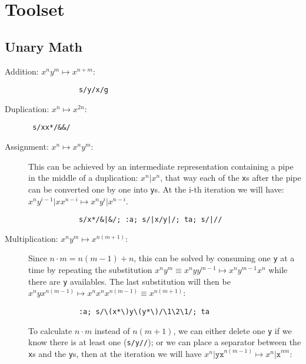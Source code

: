 \section{Toolset}

\subsection{Unary Math}

\begin{description}
	\item[Addition: $x^ny^m\mapsto x^{n+m}$:]
		\begin{verbatim}
			s/y/x/g
		\end{verbatim}

	\item[Duplication: $x^n\mapsto x^{2n}$:]
		\begin{verbatim} s/xx*/&&/ \end{verbatim}

	\item[Assignment: $x^n\mapsto x^ny^m$:]

		This can be achieved by an intermediate representation containing a pipe in
		the middle of a duplication: $x^n\texttt{|}x^n$, that way each of the
		{\tt x}s after the pipe can be converted one by one into {\tt y}s.  At the
		i-th iteration we will have:
		$x^ny^{i-1}\texttt{|}xx^{n-i} \mapsto x^ny^i\texttt{|}x^{n-i}$.

		\begin{Verbatim}
			s/x*/&|&/; :a; s/|x/y|/; ta; s/|//
		\end{Verbatim}

	\item[Multiplication: $x^ny^m\mapsto x^{n(m+1)}$:]

		Since $n\cdot m=n(m-1)+n$, this can be solved by consuming one {\tt y}
		at a time by repeating the substitution $x^ny^m \equiv x^nyy^{m-1}
		\mapsto	x^ny^{m-1}x^n$ while there are {\tt y} availables.  The last
		substitution will then be $x^nyx^{n(m-1)} \mapsto x^nx^nx^{n(m-1)}
		\equiv x^{n(m+1)}$:

		\begin{Verbatim}
			:a; s/\(x*\)y\(y*\)/\1\2\1/; ta
		\end{Verbatim}

		To calculate $n\cdot m$ instead of $n(m+1)$, we can either delete one
		{\tt y} if we know there is at least one (\verb|s/y//|); or we can place
		a separator between the {\tt x}s and the {\tt y}s, then at the iteration
		we will have $x^n\texttt{|yx}^{n(m-1)} \mapsto x^n\texttt{|x}^{nm}$:


\end{description}
